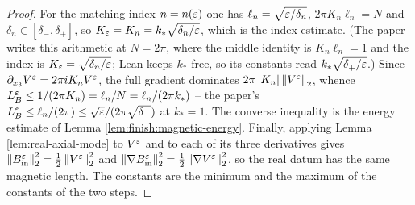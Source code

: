 \begin{proof}
  \leanok
  For the matching index $n=n(\varepsilon)$ one has $\ell_n=\sqrt{\varepsilon/\delta_n}$, $2\pi K_n\ell_n=N$
  and $\delta_n\in[\delta_-,\delta_+]$, so $K_\varepsilon=K_n=k_*\sqrt{\delta_n/\varepsilon}$, which is the
  index estimate.  (The paper writes this arithmetic at $N=2\pi$, where the middle identity
  is $K_n\ell_n=1$ and the index is $K_\varepsilon=\sqrt{\delta_n/\varepsilon}$; Lean keeps
  $k_*$ free, so its constants read $k_*\sqrt{\delta_\mp/\varepsilon}$.)  Since
  $\partial_{x_3}V^\varepsilon=2\pi iK_nV^\varepsilon$, the full gradient dominates
  $2\pi\left\lvert K_n\right\rvert\left\|V^\varepsilon\right\|_2$, whence
  $L_B^\varepsilon\leq1/(2\pi K_n)=\ell_n/N=\ell_n/(2\pi k_*)$ -- the paper's
  $L_B^\varepsilon\leq\ell_n/(2\pi)\leq\sqrt{\varepsilon}/(2\pi\sqrt{\delta_-})$ at $k_*=1$.
  The converse inequality is the energy estimate of Lemma
  \ref{lem:finish:magnetic-energy}.  Finally, applying
  Lemma \ref{lem:real-axial-mode} to $V^\varepsilon$ and to each of its three derivatives gives
  $\left\|B_{\rm in}^\varepsilon\right\|_2^2=\frac12\left\|V^\varepsilon\right\|_2^2$ and
  $\left\|\nabla B_{\rm in}^\varepsilon\right\|_2^2=\frac12\left\|\nabla V^\varepsilon\right\|_2^2$, so the real datum has the
  same magnetic length.  The constants are the minimum and the maximum of the constants of
  the two steps.
\end{proof}
